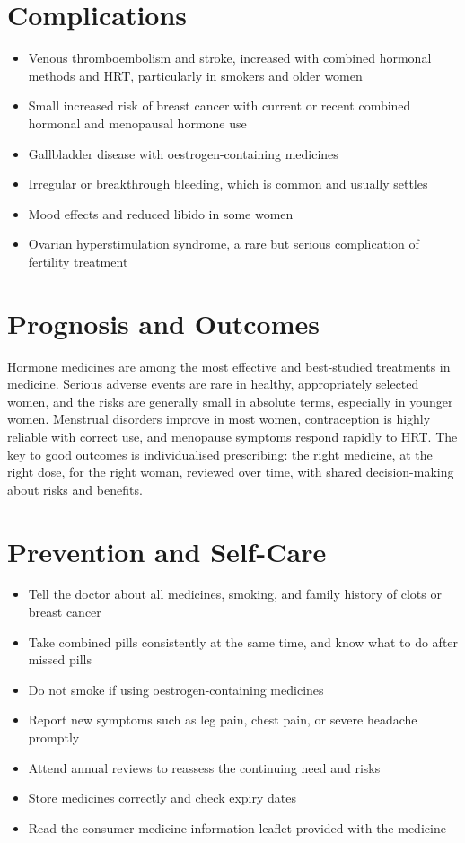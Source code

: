 \section*{Complications}
\begin{itemize}
    \item Venous thromboembolism and stroke, increased with combined hormonal methods and HRT, particularly in smokers and older women
    \item Small increased risk of breast cancer with current or recent combined hormonal and menopausal hormone use
    \item Gallbladder disease with oestrogen-containing medicines
    \item Irregular or breakthrough bleeding, which is common and usually settles
    \item Mood effects and reduced libido in some women
    \item Ovarian hyperstimulation syndrome, a rare but serious complication of fertility treatment
\end{itemize}

\section*{Prognosis and Outcomes}
Hormone medicines are among the most effective and best-studied treatments in medicine. Serious adverse events are rare in healthy, appropriately selected women, and the risks are generally small in absolute terms, especially in younger women. Menstrual disorders improve in most women, contraception is highly reliable with correct use, and menopause symptoms respond rapidly to HRT. The key to good outcomes is individualised prescribing: the right medicine, at the right dose, for the right woman, reviewed over time, with shared decision-making about risks and benefits.

\section*{Prevention and Self-Care}
\begin{itemize}
    \item Tell the doctor about all medicines, smoking, and family history of clots or breast cancer
    \item Take combined pills consistently at the same time, and know what to do after missed pills
    \item Do not smoke if using oestrogen-containing medicines
    \item Report new symptoms such as leg pain, chest pain, or severe headache promptly
    \item Attend annual reviews to reassess the continuing need and risks
    \item Store medicines correctly and check expiry dates
    \item Read the consumer medicine information leaflet provided with the medicine
\end{itemize}


